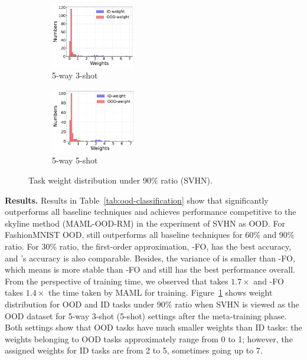 \begin{figure}[!t]
\vspace{-3mm}
    \centering
    \begin{subfigure}[b]{0.23\textwidth}
        \centering
        \includegraphics[width=\linewidth, height=2.8cm]{figs/5-Way-3-Shot-ood90.pdf}
        \caption{5-way 3-shot}
    \end{subfigure}
    \begin{subfigure}[b]{0.23\textwidth}
        \centering
        \includegraphics[width=\linewidth, height=2.8cm]{figs/5-Way-5-Shot-ood90.pdf}
        \caption{5-way 5-shot}
    \end{subfigure}
    \vspace{-2mm}
    \caption{Task weight distribution under 90\% ratio (SVHN).}
    \label{fig:weights histogram}
\end{figure}

\textbf{Results.} Results in Table~\ref{tab:ood-classification} show that \sysname{} significantly outperforms all baseline techniques and achieves performance competitive to the skyline method (MAML-OOD-RM) in the experiment of SVHN as OOD. For FashionMNIST OOD, \sysname{} still outperforms all baseline techniques for 60\% and 90\% ratio. For 30\% ratio, the first-order approximation, \sysname{}-FO, has the best accuracy, and \sysname{}'s accuracy is also comparable. Besides, the variance of \sysname{} is smaller than \sysname{}-FO, which means \sysname{} is more stable than \sysname{}-FO and \sysname{} still has the best performance overall. From the perspective of training time, we observed that \sysname{} takes $\mathbf{1.7 \times}$ and \sysname{}-FO takes $\mathbf{1.4 \times}$ the time taken by MAML for training. Figure~\ref{fig:weights histogram} shows weight distribution for OOD and ID tasks under 90\% ratio when SVHN is viewed as the OOD dataset for 5-way 3-shot (5-shot) settings after the meta-training phase. Both settings show that OOD tasks have much smaller weights than ID tasks: the weights belonging to OOD tasks approximately range from 0 to 1; however, the assigned weights for ID tasks are from 2 to 5, sometimes going up to 7. 

